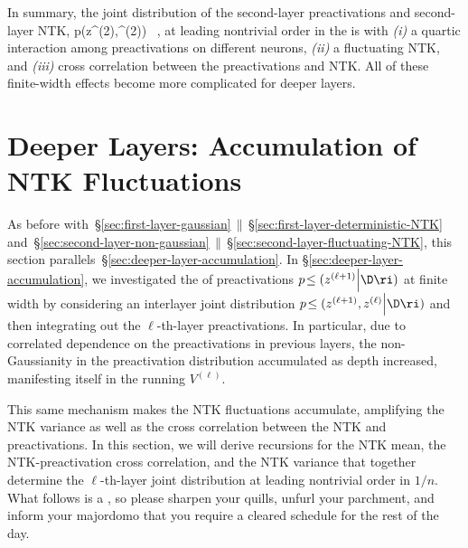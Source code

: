In summary, the joint distribution of the second-layer preactivations and second-layer NTK,
\be
p\!\le(z^{(2)},\NTK^{(2)}\Big\vert \D\ri) \, ,
\ee
at leading nontrivial order in the  is  with  \emph{(i)} a quartic interaction among preactivations on different neurons, \emph{(ii)} a fluctuating NTK, and \emph{(iii)} cross correlation between the preactivations and NTK. %
All of these finite-width effects become more complicated for deeper layers.












\section{Deeper Layers: Accumulation of NTK Fluctuations}
\label{sec:deeper-layer-accumulation-NTK}
As before with~\S\ref{sec:first-layer-gaussian}$\,\parallel\,$\S\ref{sec:first-layer-deterministic-NTK} and~\S\ref{sec:second-layer-non-gaussian}$\,\parallel\,$\S\ref{sec:second-layer-fluctuating-NTK}, this section parallels~\S\ref{sec:deeper-layer-accumulation}. 
In \S\ref{sec:deeper-layer-accumulation}, we investigated the  of preactivations $p\!\le(z^{(\ell+1)}\Big\vert\D\ri)$
at finite width by considering an interlayer joint distribution $p\!\le(z^{(\ell+1)}, z^{(\ell)}\Big\vert\D\ri)$ and then integrating out the $\ell$-th-layer preactivations.
In particular, due to correlated dependence on the preactivations in previous layers, the non-Gaussianity in the preactivation distribution accumulated as depth increased, manifesting itself in the running  $V^{(\ell)}$.



This same mechanism makes the NTK fluctuations accumulate, amplifying the NTK variance as well as the cross correlation between the NTK and preactivations.
In this section, we will derive recursions for the NTK mean,  the NTK-preactivation cross correlation, and the NTK variance that together determine the $\ell$-th-layer joint distribution at leading nontrivial order in $1/n$.
What follows is a , so please sharpen your quills, unfurl your parchment, and inform your majordomo that you require a cleared schedule for the rest of the day. %



